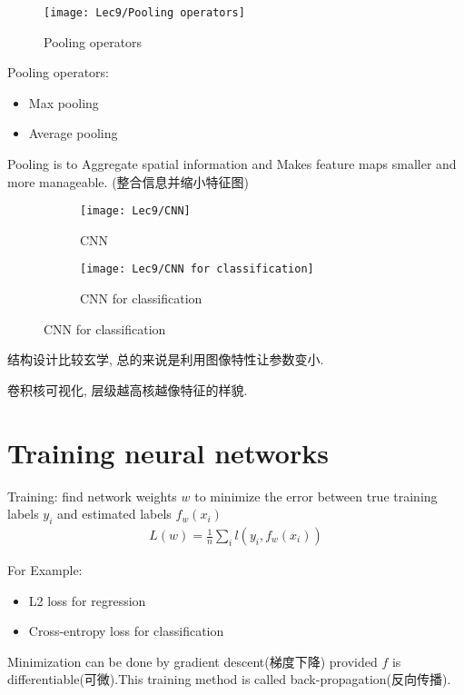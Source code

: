 \begin{wrapfigure}[5]{r}{0.38\textwidth}
	\centering
    \texttt{[image: Lec9/Pooling operators]}
    \caption{Pooling operators}
\end{wrapfigure}

Pooling operators: 
\begin{itemize}
    \item Max pooling
    \item Average pooling
\end{itemize}

Pooling is to Aggregate spatial information and Makes feature maps smaller and more manageable. (整合信息并缩小特征图)

\begin{figure}[H]
    \centering
    \begin{subfigure}{0.15\textwidth}
        \centering
        \texttt{[image: Lec9/CNN]}
        \caption{CNN}
    \end{subfigure}
    \begin{subfigure}{0.48\textwidth}
        \centering
        \texttt{[image: Lec9/CNN for classification]}
        \caption{CNN for classification}
    \end{subfigure}
\end{figure}

结构设计比较玄学, 总的来说是利用图像特性让参数变小. 

卷积核可视化, 层级越高核越像特征的样貌. 

\section{Training neural networks}
Training: find network weights $w$ to minimize the error
between true training labels $y_i$ and estimated labels $f_w(x_i)$
\begin{align*}
    L(w)=\frac{1}{n}\sum_i l(y_i, f_w(x_i))
\end{align*}

For Example:
\begin{itemize}
    \item L2 loss for regression
    \item Cross-entropy loss for classification
\end{itemize}

Minimization can be done by gradient descent(梯度下降) provided $f$ is differentiable(可微).This training method is called back-propagation(反向传播). 

